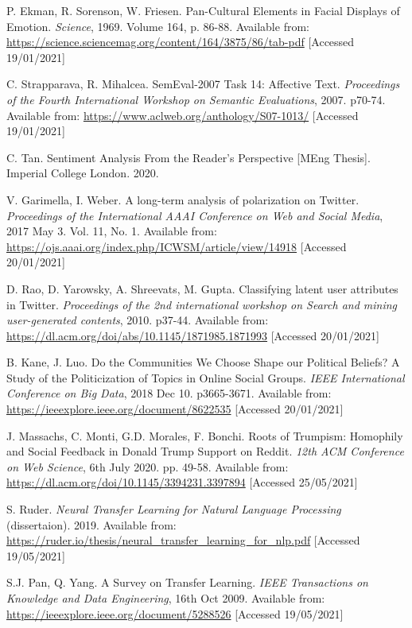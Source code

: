 \begin{thebibliography}{9}
P. Ekman, R. Sorenson, W. Friesen. Pan-Cultural Elements in Facial Displays of Emotion. \textit{Science}, 1969. Volume 164, p. 86-88. Available from: \url{https://science.sciencemag.org/content/164/3875/86/tab-pdf} [Accessed 19/01/2021]

C. Strapparava, R. Mihalcea. SemEval-2007 Task 14: Affective Text. \textit{Proceedings of the Fourth International Workshop on Semantic Evaluations}, 2007. p70-74. Available from: \url{https://www.aclweb.org/anthology/S07-1013/} [Accessed 19/01/2021]

C. Tan. Sentiment Analysis From the Reader’s Perspective [MEng Thesis]. Imperial College London. 2020.

V. Garimella, I. Weber. A long-term analysis of polarization on Twitter. \textit{Proceedings of the International AAAI Conference on Web and Social Media}, 2017 May 3. Vol. 11, No. 1. Available from: \url{https://ojs.aaai.org/index.php/ICWSM/article/view/14918} [Accessed 20/01/2021]

D. Rao, D. Yarowsky, A. Shreevats, M. Gupta. Classifying latent user attributes in Twitter. \textit{Proceedings of the 2nd international workshop on Search and mining user-generated contents}, 2010. p37-44. Available from: \url{https://dl.acm.org/doi/abs/10.1145/1871985.1871993} [Accessed 20/01/2021]

B. Kane, J. Luo. Do the Communities We Choose Shape our Political Beliefs? A Study of the Politicization of Topics in Online Social Groups. \textit{IEEE International Conference on Big Data}, 2018 Dec 10. p3665-3671. Available from: \url{https://ieeexplore.ieee.org/document/8622535} [Accessed 20/01/2021]

J. Massachs, C. Monti, G.D. Morales, F. Bonchi. Roots of Trumpism: Homophily and Social Feedback in Donald Trump Support on Reddit. \textit{12th ACM Conference on Web Science}, 6th July 2020. pp. 49-58. Available from: \url{https://dl.acm.org/doi/10.1145/3394231.3397894} [Accessed 25/05/2021]

S. Ruder. \textit{Neural Transfer Learning for Natural Language Processing} (dissertaion). 2019. Available from: \url{https://ruder.io/thesis/neural_transfer_learning_for_nlp.pdf} [Accessed 19/05/2021]

S.J. Pan, Q. Yang. A Survey on Transfer Learning. \textit{IEEE Transactions on Knowledge and Data Engineering}, 16th Oct 2009. Available from: \url{https://ieeexplore.ieee.org/document/5288526} [Accessed 19/05/2021]


\end{thebibliography}
